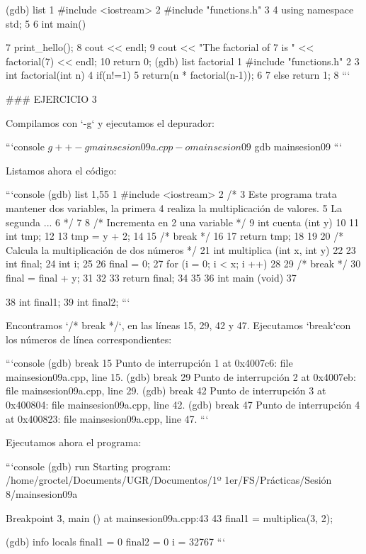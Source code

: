   (gdb) list
  1	#include <iostream>
  2	#include "functions.h"
  3
  4	using namespace std;
  5
  6	int main(){
  7	    print_hello();
  8	    cout << endl;
  9	    cout << "The factorial of 7 is " << factorial(7) << endl;
  10	    return 0;
  (gdb) list factorial
  1	#include "functions.h"
  2
  3	int factorial(int n){
  4	    if(n!=1){
  5		return(n * factorial(n-1));
  6	    }
  7	    else return 1;
  8	}
```

### EJERCICIO 3

Compilamos con `-g` y ejecutamos el depurador:

```console
$ g++ -g mainsesion09a.cpp -o mainsesion09
$ gdb mainsesion09
```

Listamos ahora el código:

```console
  (gdb) list 1,55
  1	#include <iostream>
  2	/*
  3	 Este programa trata mantener dos variables, la primera 
  4	 realiza la multiplicación de valores.
  5	 La segunda ...
  6	*/
  7	
  8	/* Incrementa en 2 una variable */
  9	int cuenta (int y)
  10	{
  11	   int tmp;
  12	
  13	   tmp = y + 2; 
  14	
  15	   /* break */
  16	
  17	   return tmp;
  18	}
  19	
  20	/* Calcula la multiplicación de dos números */
  21	int multiplica (int x, int y)
  22	{
  23	   int final;
  24	   int i;
  25	
  26	   final = 0;
  27	   for (i = 0; i < x; i ++)
  28	   {
  29	      /* break */
  30	      final = final + y;
  31	   }
  32	
  33	   return final;
  34	}
  35	
  36	int main (void)
  37	{
  38	   int final1;
  39	   int final2;
```

Encontramos `/* break */`, en las líneas 15, 29, 42 y 47. Ejecutamos `break`con los números de línea correspondientes:

```console
  (gdb) break 15
  Punto de interrupción 1 at 0x4007c6: file mainsesion09a.cpp, line 15.
  (gdb) break 29
  Punto de interrupción 2 at 0x4007eb: file mainsesion09a.cpp, line 29.
  (gdb) break 42
  Punto de interrupción 3 at 0x400804: file mainsesion09a.cpp, line 42.
  (gdb) break 47
  Punto de interrupción 4 at 0x400823: file mainsesion09a.cpp, line 47.
```

Ejecutamos ahora el programa:

```console
  (gdb) run
  Starting program: /home/groctel/Documents/UGR/Documentos/1º 1er/FS/Prácticas/Sesión 8/mainsesion09a 

  Breakpoint 3, main () at mainsesion09a.cpp:43
  43	   final1 = multiplica(3, 2);

  (gdb) info locals
  final1 = 0
  final2 = 0
  i = 32767
```

}}

